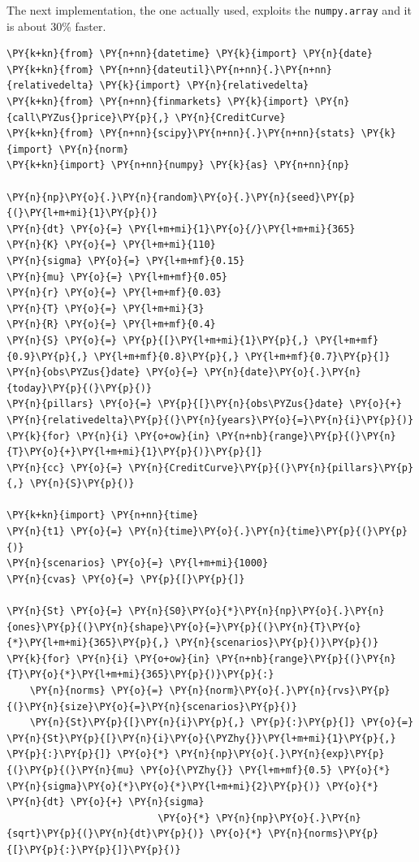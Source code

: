 \begin{Answer}
The next implementation, the one actually used, exploits the \texttt{numpy.array} and it is about 30\% faster.

\begin{tcolorbox}[size=fbox, boxrule=1pt, colback=cellbackground, colframe=cellborder]
\begin{Verbatim}[commandchars=\\\{\}]
\PY{k+kn}{from} \PY{n+nn}{datetime} \PY{k}{import} \PY{n}{date}
\PY{k+kn}{from} \PY{n+nn}{dateutil}\PY{n+nn}{.}\PY{n+nn}{relativedelta} \PY{k}{import} \PY{n}{relativedelta}
\PY{k+kn}{from} \PY{n+nn}{finmarkets} \PY{k}{import} \PY{n}{call\PYZus{}price}\PY{p}{,} \PY{n}{CreditCurve}
\PY{k+kn}{from} \PY{n+nn}{scipy}\PY{n+nn}{.}\PY{n+nn}{stats} \PY{k}{import} \PY{n}{norm}
\PY{k+kn}{import} \PY{n+nn}{numpy} \PY{k}{as} \PY{n+nn}{np}
		
\PY{n}{np}\PY{o}{.}\PY{n}{random}\PY{o}{.}\PY{n}{seed}\PY{p}{(}\PY{l+m+mi}{1}\PY{p}{)}
\PY{n}{dt} \PY{o}{=} \PY{l+m+mi}{1}\PY{o}{/}\PY{l+m+mi}{365}
\PY{n}{K} \PY{o}{=} \PY{l+m+mi}{110}
\PY{n}{sigma} \PY{o}{=} \PY{l+m+mf}{0.15}
\PY{n}{mu} \PY{o}{=} \PY{l+m+mf}{0.05}
\PY{n}{r} \PY{o}{=} \PY{l+m+mf}{0.03}
\PY{n}{T} \PY{o}{=} \PY{l+m+mi}{3}
\PY{n}{R} \PY{o}{=} \PY{l+m+mf}{0.4}
\PY{n}{S} \PY{o}{=} \PY{p}{[}\PY{l+m+mi}{1}\PY{p}{,} \PY{l+m+mf}{0.9}\PY{p}{,} \PY{l+m+mf}{0.8}\PY{p}{,} \PY{l+m+mf}{0.7}\PY{p}{]}
\PY{n}{obs\PYZus{}date} \PY{o}{=} \PY{n}{date}\PY{o}{.}\PY{n}{today}\PY{p}{(}\PY{p}{)}
\PY{n}{pillars} \PY{o}{=} \PY{p}{[}\PY{n}{obs\PYZus{}date} \PY{o}{+} \PY{n}{relativedelta}\PY{p}{(}\PY{n}{years}\PY{o}{=}\PY{n}{i}\PY{p}{)} \PY{k}{for} \PY{n}{i} \PY{o+ow}{in} \PY{n+nb}{range}\PY{p}{(}\PY{n}{T}\PY{o}{+}\PY{l+m+mi}{1}\PY{p}{)}\PY{p}{]}
\PY{n}{cc} \PY{o}{=} \PY{n}{CreditCurve}\PY{p}{(}\PY{n}{pillars}\PY{p}{,} \PY{n}{S}\PY{p}{)}
		
\PY{k+kn}{import} \PY{n+nn}{time}
\PY{n}{t1} \PY{o}{=} \PY{n}{time}\PY{o}{.}\PY{n}{time}\PY{p}{(}\PY{p}{)}
\PY{n}{scenarios} \PY{o}{=} \PY{l+m+mi}{1000}
\PY{n}{cvas} \PY{o}{=} \PY{p}{[}\PY{p}{]}
		
\PY{n}{St} \PY{o}{=} \PY{n}{S0}\PY{o}{*}\PY{n}{np}\PY{o}{.}\PY{n}{ones}\PY{p}{(}\PY{n}{shape}\PY{o}{=}\PY{p}{(}\PY{n}{T}\PY{o}{*}\PY{l+m+mi}{365}\PY{p}{,} \PY{n}{scenarios}\PY{p}{)}\PY{p}{)}    
\PY{k}{for} \PY{n}{i} \PY{o+ow}{in} \PY{n+nb}{range}\PY{p}{(}\PY{n}{T}\PY{o}{*}\PY{l+m+mi}{365}\PY{p}{)}\PY{p}{:}
    \PY{n}{norms} \PY{o}{=} \PY{n}{norm}\PY{o}{.}\PY{n}{rvs}\PY{p}{(}\PY{n}{size}\PY{o}{=}\PY{n}{scenarios}\PY{p}{)}
    \PY{n}{St}\PY{p}{[}\PY{n}{i}\PY{p}{,} \PY{p}{:}\PY{p}{]} \PY{o}{=} \PY{n}{St}\PY{p}{[}\PY{n}{i}\PY{o}{\PYZhy{}}\PY{l+m+mi}{1}\PY{p}{,} \PY{p}{:}\PY{p}{]} \PY{o}{*} \PY{n}{np}\PY{o}{.}\PY{n}{exp}\PY{p}{(}\PY{p}{(}\PY{n}{mu} \PY{o}{\PYZhy{}} \PY{l+m+mf}{0.5} \PY{o}{*} \PY{n}{sigma}\PY{o}{*}\PY{o}{*}\PY{l+m+mi}{2}\PY{p}{)} \PY{o}{*} \PY{n}{dt} \PY{o}{+} \PY{n}{sigma}
                          \PY{o}{*} \PY{n}{np}\PY{o}{.}\PY{n}{sqrt}\PY{p}{(}\PY{n}{dt}\PY{p}{)} \PY{o}{*} \PY{n}{norms}\PY{p}{[}\PY{p}{:}\PY{p}{]}\PY{p}{)}
\end{Verbatim}
\end{tcolorbox}


\end{Answer}

